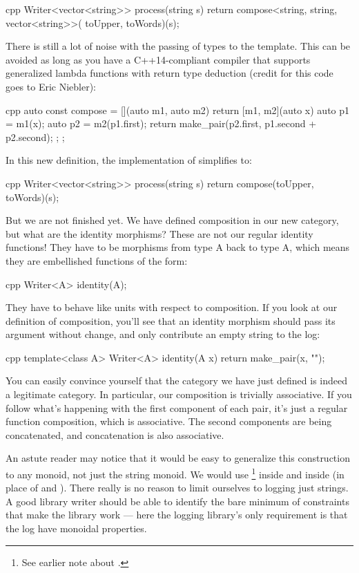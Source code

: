 \begin{snip}{cpp}
Writer<vector<string>> process(string s) {
    return compose<string, string, vector<string>>(
        toUpper, toWords)(s);
}
\end{snip}
There is still a lot of noise with the passing of types to the
 template. This can be avoided as long as you have a
C++14-compliant compiler that supports generalized lambda functions with
return type deduction (credit for this code goes to Eric Niebler):

\begin{snip}{cpp}
auto const compose = [](auto m1, auto m2) { 
    return [m1, m2](auto x) { 
        auto p1 = m1(x);
        auto p2 = m2(p1.first);
        return make_pair(p2.first, p1.second + p2.second);
    };
};
\end{snip}
In this new definition, the implementation of 
simplifies to:

\begin{snip}{cpp}
Writer<vector<string>> process(string s) {
    return compose(toUpper, toWords)(s);
}
\end{snip}
But we are not finished yet. We have defined composition in our new
category, but what are the identity morphisms? These are not our regular
identity functions! They have to be morphisms from type A back to type
A, which means they are embellished functions of the form:

\begin{snip}{cpp}
Writer<A> identity(A);
\end{snip}
They have to behave like units with respect to composition. If you look
at our definition of composition, you'll see that an identity morphism
should pass its argument without change, and only contribute an empty
string to the log:

\begin{snip}{cpp}
template<class A> Writer<A> identity(A x) {
    return make_pair(x, "");
}
\end{snip}
You can easily convince yourself that the category we have just defined
is indeed a legitimate category. In particular, our composition is
trivially associative. If you follow what's happening with the first
component of each pair, it's just a regular function composition, which
is associative. The second components are being concatenated, and
concatenation is also associative.

An astute reader may notice that it would be easy to generalize this
construction to any monoid, not just the string monoid. We would use
\code{(<>)}\footnote{See earlier note about .} inside  and  inside
 (in place of \code{+} and ). 
There really
is no reason to limit ourselves to logging just strings. A good library
writer should be able to identify the bare minimum of constraints that
make the library work --- here the logging library's only requirement is
that the log have monoidal properties.

